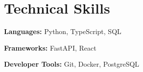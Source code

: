 \documentclass[10pt,letterpaper]{article}
\newenvironment{onecolentry}{}{}
\begin{document}
    \vspace{0.10 cm}
    \section{Technical Skills}

    \begin{onecolentry}
        \textbf{Languages:} Python, TypeScript, SQL
    \end{onecolentry}

    \vspace{0.1 cm}
    \begin{onecolentry}
        \textbf{Frameworks:} FastAPI, React
    \end{onecolentry}

    \vspace{0.1 cm}
    \begin{onecolentry}
        \textbf{Developer Tools:} Git, Docker, PostgreSQL
    \end{onecolentry}
\end{document}
